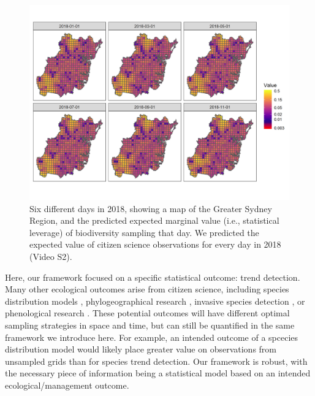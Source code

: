 \documentclass[9pt,twocolumn,twoside,lineno]{pnas-new}
\begin{document}
\begin{figure}[!hb]
\centering
\includegraphics[width=.8\linewidth]{example_maps.png}
\caption{Six different days in 2018, showing a map of the Greater Sydney Region, and the predicted expected marginal value (i.e., statistical leverage) of biodiversity sampling that day. We predicted the expected value of citizen science observations for every day in 2018 (Video S2).}
\label{fig3}
\end{figure}

Here, our framework focused on a specific statistical outcome: trend detection. Many other ecological outcomes arise from citizen science, including species distribution models \cite{bradsworth2017species, van2013opportunistic}, phylogeographical research \cite{bahls2014new, drury2019continent}, invasive species detection \cite{pocock2017citizen, grason2018citizen}, or phenological research \cite{la2014role, supp2015citizen}. These potential outcomes will have different optimal sampling strategies in space and time, but can still be quantified in the same framework we introduce here. For example, an intended outcome of a spcecies distribution model would likely place greater value on observations from unsampled grids \cite{crawley2001scale} than for species trend detection. Our framework is robust, with the necessary piece of information being a statistical model based on an intended ecological/management outcome.
\end{document}

